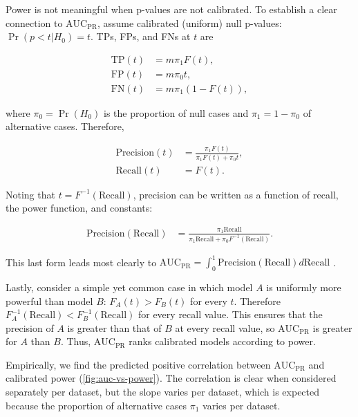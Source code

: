 \documentclass[11pt]{article}
\newcommand{\auc}{\text{AUC}_\text{PR}}
\begin{document}
\begin{linenumbers}
Power is not meaningful when p-values are not calibrated.
To establish a clear connection to $\auc$, assume calibrated (uniform) null p-values: $\Pr( p < t | H_0 ) = t$.
TPs, FPs, and FNs at $t$ are
\begin{linenomath*}
\begin{align*}
  \text{TP}(t)
  &=
    m \pi_1 F(t)
    , \\
  \text{FP}(t)
  &=
    m \pi_0 t
    , \\
  \text{FN}(t)
  &=
    m \pi_1 ( 1 - F(t) )
    ,
\end{align*}
\end{linenomath*}
where $\pi_0 = \Pr( H_0 )$ is the proportion of null cases and $\pi_1 = 1 - \pi_0$ of alternative cases.
Therefore, 
\begin{linenomath*}
\begin{align*}
  \text{Precision}(t)
  &=
    \frac{ \pi_1 F(t) }{ \pi_1 F(t) + \pi_0 t }
    , \\
  \text{Recall}(t)
  &=
    F(t)
    .
\end{align*}
\end{linenomath*}
Noting that $t = F^{-1}( \text{Recall} )$, precision can be written as a function of recall, the power function, and constants:
\begin{linenomath*}
\begin{align*}
  \text{Precision}( \text{Recall} )
  &=
    \frac{ \pi_1 \text{Recall} }{ \pi_1 \text{Recall} + \pi_0 F^{-1}( \text{Recall} ) }
    .
\end{align*}
\end{linenomath*}
This last form leads most clearly to
$
\auc
=
\int_0^1 \text{Precision}( \text{Recall} ) d \text{Recall}
$
.

Lastly, consider a simple yet common case in which model $A$ is uniformly more powerful than model $B$: $F_A(t) > F_B(t)$ for every $t$.
Therefore $F_A^{-1}( \text{Recall} ) < F_B^{-1}( \text{Recall} )$ for every recall value.
This ensures that the precision of $A$ is greater than that of $B$ at every recall value, so $\auc$ is greater for $A$ than $B$.
Thus, $\auc$ ranks calibrated models according to power.

Empirically, we find the predicted positive correlation between $\auc$ and calibrated power (\cref{fig:auc-vs-power}).
The correlation is clear when considered separately per dataset, but the slope varies per dataset, which is expected because the proportion of alternative cases $\pi_1$ varies per dataset.



\end{linenumbers}
\end{document}
